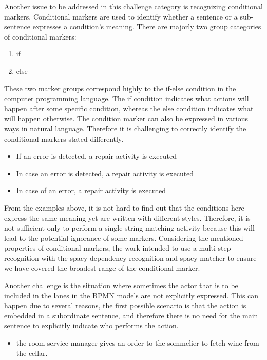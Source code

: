 Another issue to be addressed in this challenge category is recognizing conditional markers. Conditional markers are used to identify whether a sentence or a sub-sentence expresses a condition's meaning. There are majorly two group categories of conditional markers: 

\begin{enumerate}
    \item if
    \item else
\end{enumerate}

These two marker groups correspond highly to the if-else condition in the computer programming language. The if condition indicates what actions will happen after some specific condition, whereas the else condition indicates what will happen otherwise. The condition marker can also be expressed in various ways in natural language. Therefore it is challenging to correctly identify the conditional markers stated differently. 

\begin{itemize}
    \item If an error is detected, a repair activity is executed
    \item In case an error is detected, a repair activity is executed
    \item In case of an error, a repair activity is executed
\end{itemize}

From the examples above, it is not hard to find out that the conditions here express the same meaning yet are written with different styles. Therefore, it is not sufficient only to perform a single string matching activity because this will lead to the potential ignorance of some markers. Considering the mentioned properties of conditional markers, the work intended to use a multi-step recognition with the spacy dependency recognition and spacy matcher to ensure we have covered the broadest range of the conditional marker. 

Another challenge is the situation where sometimes the actor that is to be included in the lanes in the BPMN models are not explicitly expressed. This can happen due to several reasons, the first possible scenario is that the action is embedded in a subordinate sentence, and therefore there is no need for the main sentence to explicitly indicate who performs the action.

\begin{itemize}
    \item the room-service manager gives an order to the sommelier to fetch wine from the cellar.
\end{itemize}

